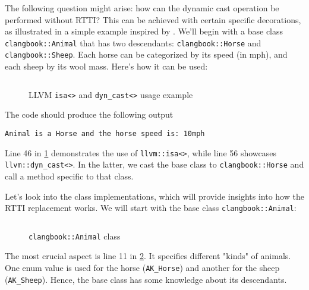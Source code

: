 The following question might arise: how can the dynamic cast operation be
performed without RTTI? This can be achieved with certain specific decorations,
as illustrated in a simple example inspired by \citep{llvm:rtti_setup}. We'll
begin with a base class \texttt{clangbook::Animal} that has two
descendants: \texttt{clangbook::Horse} and
\texttt{clangbook::Sheep}. Each horse can be categorized by its speed
(in mph), and each sheep by its wool mass. Here's how it can be used: 
\begin{figure}[H]
\inputminted[highlightlines={48,51},
  firstline=46,lastline=56]{c++}{src/part1/ch4_baselibs/baselibs/TestCast.h}
\caption{LLVM \texttt{isa<>} and \texttt{dyn_cast<>} usage example}
\label{lis:ch4:animal:example}
\end{figure}
The code should produce the following output
\begin{adjustwidth}{0em}{0em}
\begin{verbatim}
Animal is a Horse and the horse speed is: 10mph
\end{verbatim}
\end{adjustwidth}
Line 46 in \cref{lis:ch4:animal:example} demonstrates the use of
\texttt{llvm::isa<>}, while line 56 showcases
\texttt{llvm::dyn_cast<>}. In the latter, we cast the base class to
\texttt{clangbook::Horse} and call a method specific to that class.

Let's look into the class implementations, which will provide insights into how
the RTTI replacement works. We will start with the base class
\texttt{clangbook::Animal}: 
\begin{figure}[H]
\inputminted[highlightlines={11},
  firstline=9,lastline=19]{c++}{src/part1/ch4_baselibs/baselibs/TestCast.h}
\caption{\texttt{clangbook::Animal} class}
\label{lis:ch4:animal:animal}
\end{figure}
The most crucial aspect is line 11 in \cref{lis:ch4:animal:animal}. It specifies
different "kinds" of animals. One enum value is used for the horse
(\texttt{AK_Horse}) and another for the sheep
(\texttt{AK_Sheep}). Hence, the base class has some knowledge about its
descendants. 

